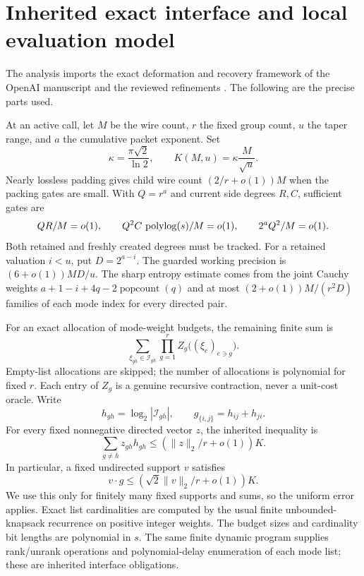 \section{Inherited exact interface and local evaluation model}
\label{sec:interface}

The analysis imports the exact deformation and recovery framework of
the OpenAI manuscript and the reviewed refinements
\cite{upstream,asymmetric,joint,tree,pairwise,affinejoint}.
The following are the precise parts used.

At an active call, let $M$ be the wire count, $r$ the fixed group count,
$u$ the taper range, and $a$ the cumulative packet exponent. Set
\[
 \kappa=\frac{\pi\sqrt2}{\ln2},\qquad K(M,u)=\kappa\frac{M}{\sqrt u}.
\]
Nearly lossless padding gives child wire count $(2/r+o(1))M$ when the
packing gates are small. With $Q=r^a$ and current side degrees $R,C$,
sufficient gates are
\[
 QR/M=o(1),\qquad Q^2 C\,\operatorname{polylog}(s)/M=o(1),\qquad
 2^aQ^2/M=o(1).
\]
Both retained and freshly created degrees must be tracked.
For a retained valuation $i<u$, put $D=2^{a-i}$. The guarded working
precision is $(6+o(1))MD/u$. The sharp entropy estimate comes from the
joint Cauchy weights $a+1-i+4q-2\operatorname{popcount}(q)$ and at most
$(2+o(1))M/(r^2D)$ families of each mode index for every directed pair.

For an exact allocation of mode-weight budgets, the remaining finite sum is
\begin{equation}\label{eq:pair-sum}
 \sum_{\xi_{gh}\in\mathcal I_{gh}}
       \prod_{g=1}^r Z_g\bigl((\xi_e)_{e\ni g}\bigr).
\end{equation}
Empty-list allocations are skipped; the number of allocations is polynomial
for fixed $r$. Each entry of $Z_g$ is a genuine recursive contraction,
never a unit-cost oracle. Write
\[
 h_{gh}=\log_2|\mathcal I_{gh}|,
 \qquad g_{\{i,j\}}=h_{ij}+h_{ji}.
\]
For every fixed nonnegative directed vector $z$, the inherited inequality is
\[
 \sum_{g\ne h}z_{gh}h_{gh}
 \le (\|z\|_2/r+o(1))K.
\]
In particular, a fixed undirected support $v$ satisfies
\begin{equation}\label{eq:undirected-entropy}
 v\cdot g\le(\sqrt2\|v\|_2/r+o(1))K.
\end{equation}
We use this only for finitely many fixed supports and sums, so the
uniform error applies. Exact list cardinalities are computed by the
usual finite unbounded-knapsack recurrence on positive integer weights.
The budget sizes and cardinality bit lengths are polynomial in $s$.
The same finite dynamic program supplies rank/unrank operations and
polynomial-delay enumeration of each mode list; these are inherited
interface obligations.

